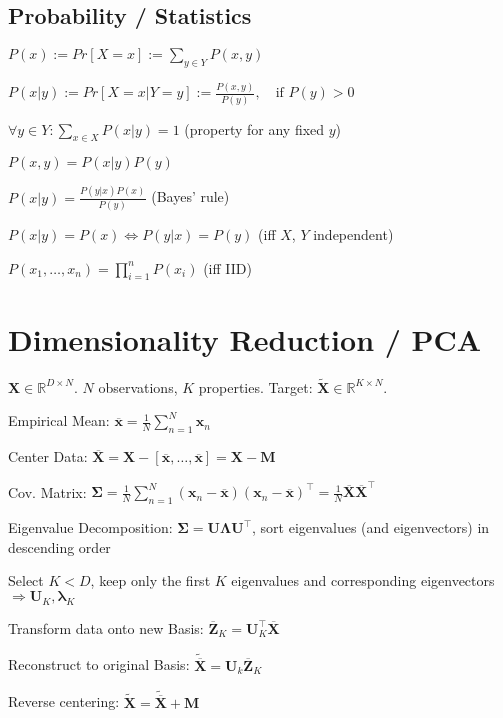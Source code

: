 \documentclass[a4paper, 11pt, landscape]{article}
\begin{document}
\begin{multicols*}{3}
\subsection{Probability / Statistics}
\begin{inparaitem}[\color{red}\textbullet]
	\item $P(x) := Pr[X = x] := \sum_{y \in Y} P(x, y)$
	\item $P(x|y) := Pr[X = x | Y = y] := \frac{P(x,y)}{P(y)},\quad \text{if } P(y) > 0$
	\item $\forall y \in Y: \sum_{x \in X} P(x|y) = 1$ (property for any fixed $y$)
	\item $P(x, y) = P(x|y) P(y)$
	\item $P(x|y) = \frac{P(y|x)P(x)}{P(y)}$ (Bayes' rule)
	\item $P(x|y) = P(x) \Leftrightarrow P(y|x) = P(y)$ (iff $X$, $Y$ independent)
	\item $P(x_1, \ldots, x_n) = \prod_{i=1}^n P(x_i)$ (iff IID)
\end{inparaitem}


\section{Dimensionality Reduction / PCA}
$\mathbf{X} \in \mathbb{R}^{D \times N}$. $N$ observations, $K$ properties. Target: $\tilde{\mathbf{X}} \in \mathbb{R}^{K \times N}$.
\begin{compactenum}
	\item Empirical Mean: $\overline{\mathbf{x}} = \frac{1}{N} \sum_{n=1}^N \mathbf{x}_n$
	\item Center Data: $\overline{\mathbf{X}} = \mathbf{X} - [\overline{\mathbf{x}}, \ldots, \overline{\mathbf{x}}] = \mathbf{X} - \mathbf{M}$
	\item Cov. Matrix: $\boldsymbol{\Sigma} = \frac{1}{N	} \sum_{n=1}^N (\mathbf{x}_n - \overline{\mathbf{x}}) (\mathbf{x}_n - \overline{\mathbf{x}})^\top = \frac{1}{N} \overline{\mathbf{X}}\overline{\mathbf{X}}^\top$
	\item Eigenvalue Decomposition: $\boldsymbol{\Sigma} = \mathbf{U} \boldsymbol{\Lambda} \mathbf{U}^\top$, sort eigenvalues (and eigenvectors) in descending order
	\item Select $K < D$, keep only the first $K$ eigenvalues and corresponding eigenvectors $\Rightarrow \mathbf{U}_K, \boldsymbol{\lambda}_K$
	\item Transform data onto new Basis: $\overline{\mathbf{Z}}_K = \mathbf{U}_K^\top \overline{\mathbf{X}}$
	\item Reconstruct to original Basis: $\tilde{\overline{\mathbf{X}}} = \mathbf{U}_k \overline{\mathbf{Z}}_K$
	\item Reverse centering: $\tilde{\mathbf{X}} = \tilde{\overline{\mathbf{X}}} + \mathbf{M}$
\end{compactenum}


\end{multicols*}
\end{document}
